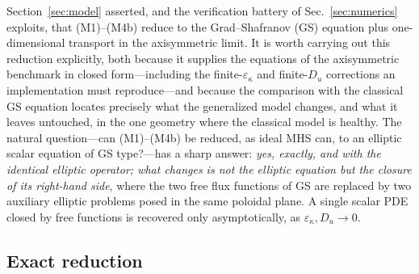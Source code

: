 \documentclass[english]{article}
\begin{document}
Section~\ref{sec:model} asserted, and the verification battery of Sec.~\ref{sec:numerics}
exploits, that (M1)--(M4b) reduce to the Grad--Shafranov (GS) equation plus one-dimensional
transport in the axisymmetric limit. It is worth carrying out this reduction explicitly, both
because it supplies the equations of the axisymmetric benchmark in closed form---including the
finite-$\varepsilon_\kappa$ and finite-$D_u$ corrections an implementation must reproduce---and
because the comparison with the classical GS equation locates precisely what the generalized model
changes, and what it leaves untouched, in the one geometry where the classical model is healthy.
The natural question---can (M1)--(M4b) be reduced, as ideal MHS can, to an elliptic scalar
equation of GS type?---has a sharp answer: \emph{yes, exactly, and with the identical elliptic
operator; what changes is not the elliptic equation but the closure of its right-hand side}, where
the two free flux functions of GS are replaced by two auxiliary elliptic problems posed in the
same poloidal plane. A single scalar PDE closed by free functions is recovered only
asymptotically, as $\varepsilon_\kappa,D_u\rightarrow0$.

\subsection{Exact reduction}
\label{sec:axisym_exact}
\end{document}

